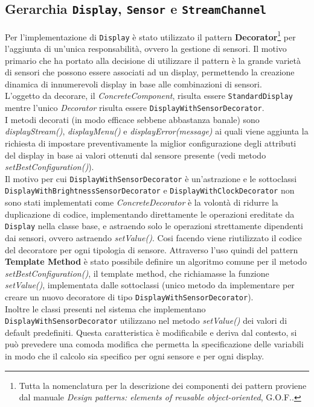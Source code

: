 \documentclass[a4paper,11pt]{article}
\begin{document}
	\subsection{Gerarchia \texttt{Display}, \texttt{Sensor} e \texttt{StreamChannel}}
	Per l'implementazione di \texttt{Display} è stato utilizzato il pattern \textbf{Decorator}\footnote{Tutta la nomenclatura per la descrizione dei componenti dei pattern proviene dal manuale \textit{Design patterns: elements of reusable object-oriented}, {\selectfont G.O.F.}.} per l'aggiunta di un'unica responsabilità, ovvero la gestione di sensori. Il motivo primario che ha portato alla decisione di utilizzare il pattern è la grande varietà di sensori che possono essere associati ad un display, permettendo la creazione dinamica di innumerevoli display in base alle combinazioni di sensori.\\
	L'oggetto da decorare, il \textit{ConcreteComponent}, risulta essere \texttt{StandardDisplay} mentre l'unico \textit{Decorator} risulta essere \texttt{DisplayWithSensorDecorator}.\\
	I metodi decorati (in modo efficace sebbene abbastanza banale) sono \textit{displayStream()}, \textit{displayMenu()} e \textit{displayError(message)} ai quali viene aggiunta la richiesta di impostare preventivamente la miglior configurazione degli attributi del display in base ai valori ottenuti dal sensore presente (vedi metodo \textit{setBestConfiguration()}).\\
	Il motivo per cui \texttt{DisplayWithSensorDecorator} è un'astrazione e le sottoclassi \texttt{DisplayWithBrightnessSensorDecorator} e \texttt{DisplayWithClockDecorator} non sono stati implementati come \textit{ConcreteDecorator} è la volontà di ridurre la duplicazione di codice, implementando direttamente le operazioni ereditate da \texttt{Display} nella classe base, e astraendo solo le operazioni strettamente dipendenti dai sensori, ovvero astraendo \textit{setValue()}. Cosi facendo viene riutilizzato il codice del decoratore per ogni tipologia di sensore. Attraverso l'uso quindi del pattern \textbf{Template Method} è stato possibile definire un algoritmo comune per il metodo \textit{setBestConfiguration()}, il template method, che richiamasse la funzione \textit{setValue()}, implementata dalle sottoclassi (unico metodo da implementare per creare un nuovo decoratore di tipo \texttt{DisplayWithSensorDecorator}).\\
	Inoltre le classi presenti nel sistema che implementano \texttt{DisplayWithSensorDecorator} utilizzano nel metodo \textit{setValue()} dei valori di default predefiniti. Questa caratteristica è modificabile e deriva dal contesto, si può prevedere una comoda modifica che permetta la specificazione delle variabili in modo che il calcolo sia specifico per ogni sensore e per ogni display.\\
\end{document}
